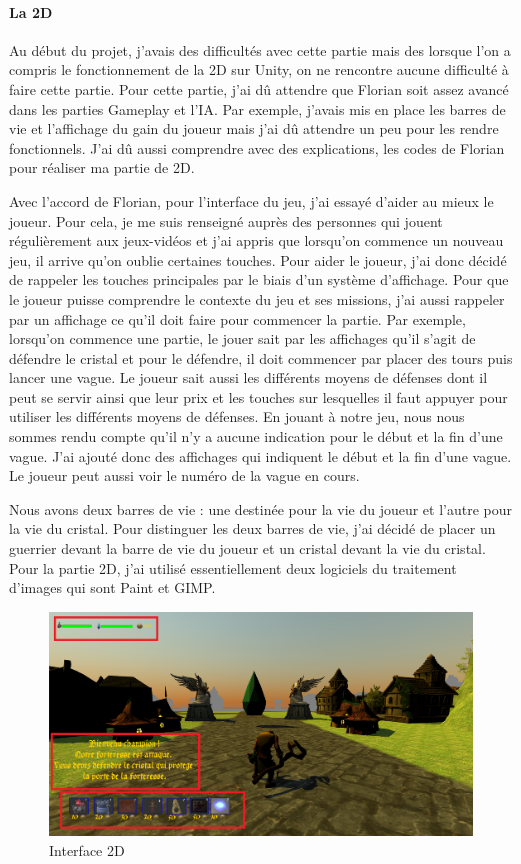 \documentclass[a4paper, 12pt]{article}
\begin{document}
\paragraph{La 2D}
Au début du projet, j’avais des difficultés avec cette partie mais des lorsque l'on a compris le fonctionnement de la 2D sur Unity, on ne rencontre aucune difficulté à faire cette partie. Pour cette partie, j’ai dû attendre que Florian soit assez avancé dans les parties Gameplay et l’IA. Par exemple, j’avais mis en place les barres de vie et l’affichage du gain du joueur mais j’ai dû attendre un peu pour les rendre fonctionnels. J’ai dû aussi comprendre avec des explications, les codes de Florian pour réaliser ma partie de 2D.
\par Avec l’accord de Florian, pour l’interface du jeu, j’ai essayé d’aider au mieux le joueur. Pour cela, je me suis renseigné auprès des personnes qui jouent régulièrement aux jeux-vidéos et j’ai appris que lorsqu’on commence un nouveau jeu, il arrive qu’on oublie certaines touches. Pour aider le joueur, j’ai donc décidé de rappeler les touches principales par le biais d'un système d’affichage. Pour que le joueur puisse comprendre le contexte du jeu et ses missions, j’ai aussi rappeler par un affichage ce qu’il doit faire pour commencer la partie. Par exemple, lorsqu’on commence une partie, le jouer sait par les affichages qu’il s’agit de défendre le cristal et pour le défendre, il doit commencer par placer des tours puis lancer une vague. Le joueur sait aussi les différents moyens de défenses dont il peut se servir ainsi que leur prix et les touches sur lesquelles il faut appuyer pour utiliser les différents moyens de défenses. En jouant \`a notre jeu, nous nous sommes rendu compte qu’il n’y a aucune indication pour le début et la fin d’une vague. J’ai ajouté donc des affichages qui indiquent le début et la fin d’une vague. Le joueur peut aussi voir le numéro de la vague en cours.
\par Nous avons deux barres de vie : une destinée pour la vie du joueur et l’autre pour la vie du cristal. Pour distinguer les deux barres de vie, j’ai décidé de placer un guerrier devant la barre de vie du joueur et un cristal devant la vie du cristal. Pour la partie 2D, j’ai utilisé essentiellement deux logiciels du traitement d’images qui sont Paint et GIMP.\\
\begin{figure}[!ht]
\centerline{\includegraphics[scale=0.3]{interface2D.png}}
\caption*{Interface 2D}
\end{figure}
\end{document}
